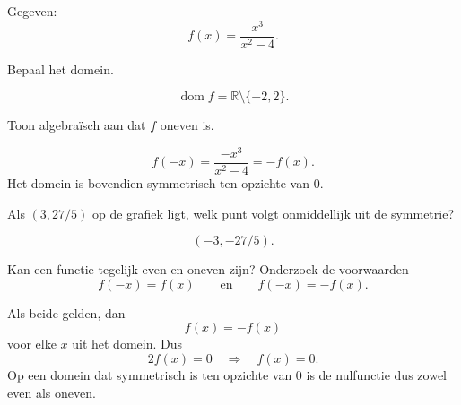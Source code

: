 \documentclass{ximera}
\begin{document}
\begin{oefening}{\oefU\ESS}

Gegeven:
\[
f(x)=\frac{x^3}{x^2-4}.
\]

\begin{question}
Bepaal het domein.
\begin{oplossing}
\[
\operatorname{dom}f=\mathbb R\setminus\{-2,2\}.
\]
\end{oplossing}
\end{question}

\begin{question}
Toon algebraïsch aan dat \(f\) oneven is.
\begin{oplossing}
\[
f(-x)=\frac{-x^3}{x^2-4}=-f(x).
\]
Het domein is bovendien symmetrisch ten opzichte van \(0\).
\end{oplossing}
\end{question}

\begin{question}
Als \((3,27/5)\) op de grafiek ligt, welk punt volgt onmiddellijk uit de symmetrie?
\begin{oplossing}
\[
(-3,-27/5).
\]
\end{oplossing}
\end{question}

\end{oefening}



\begin{oefening}{\oefG}

Kan een functie tegelijk even en oneven zijn?
Onderzoek de voorwaarden
\[
f(-x)=f(x)
\qquad\text{en}\qquad
f(-x)=-f(x).
\]

\begin{oplossing}
Als beide gelden, dan
\[
f(x)=-f(x)
\]
voor elke \(x\) uit het domein. Dus
\[
2f(x)=0
\quad\Rightarrow\quad
f(x)=0.
\]
Op een domein dat symmetrisch is ten opzichte van \(0\) is de nulfunctie dus
zowel even als oneven.
\end{oplossing}

\end{oefening}
\end{document}
